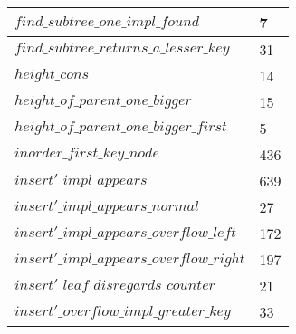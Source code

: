 \begin{tabular}{| l | l |}
$find\_subtree\_one\_impl\_found$ & 7 \\ \hline
$find\_subtree\_returns\_a\_lesser\_key$ & 31 \\ \hline
$height\_cons$ & 14 \\ \hline
$height\_of\_parent\_one\_bigger$ & 15 \\ \hline
$height\_of\_parent\_one\_bigger\_first$ & 5 \\ \hline
$inorder\_first\_key\_node$ & 436 \\ \hline
$insert'\_impl\_appears$ & 639 \\ \hline
$insert'\_impl\_appears\_normal$ & 27 \\ \hline
$insert'\_impl\_appears\_overflow\_left$ & 172 \\ \hline
$insert'\_impl\_appears\_overflow\_right$ & 197 \\ \hline
$insert'\_leaf\_disregards\_counter$ & 21 \\ \hline
$insert'\_overflow\_impl\_greater\_key$ & 33 \\ \hline
\end{tabular}
\newpage
